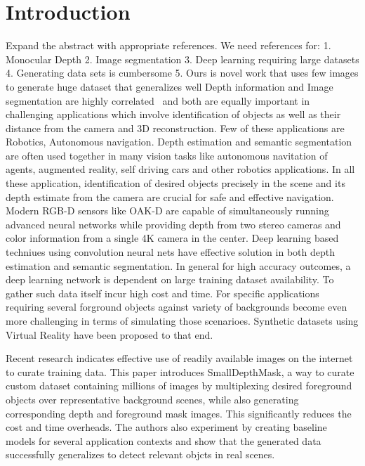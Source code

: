 \documentclass[review]{cvpr}
\begin{document}
\section{Introduction}
Expand the abstract with appropriate references. We need references for:
1. Monocular Depth
2. Image segmentation
3. Deep learning requiring large datasets
4. Generating data sets is cumbersome
5. Ours is novel work that uses few images to generate huge dataset that generalizes well
Depth information and Image segmentation are highly correlated~\cite{lin2018joint} and both are equally important in challenging applications which involve identification of objects as well as their distance from the camera and 3D reconstruction. Few of these applications are Robotics, Autonomous navigation.
Depth estimation and semantic segmentation are often used together in many vision tasks like 
autonomous navitation of agents, augmented reality, self driving cars and other robotics applications. In all these application,
identification of desired objects precisely in the scene and its depth estimate from the camera are crucial for safe and effective
navigation. Modern RGB-D sensors like OAK-D are capable of simultaneously running advanced neural networks while providing depth 
from two stereo cameras and color information from a single 4K camera in the center. Deep learning based techniues using convolution
neural nets have effective solution in both depth estimation and semantic segmentation. In general for high accuracy outcomes, a
deep learning network is dependent on large training dataset availability. To gather such data itself incur high cost and time.
For specific applications requiring several forground objects against variety of backgrounds become even more challenging in terms
of simulating those scenarioes. Synthetic datasets using Virtual Reality have been proposed to that end.

Recent research indicates effective use of readily available images on the internet to curate training data.  
This paper introduces SmallDepthMask, 
a way to curate custom dataset containing millions of images by multiplexing desired foreground objects over representative background 
scenes, while also generating corresponding depth and foreground mask images. This significantly reduces the cost and time overheads.
The authors also experiment by creating baseline models for several application contexts and show that the generated data
successfully generalizes to detect relevant objcts in real scenes.
\end{document}
